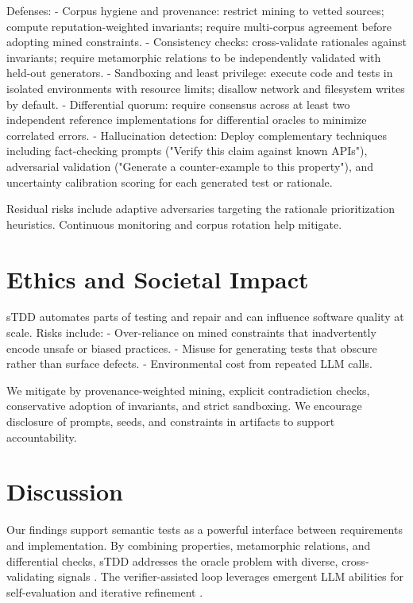 \documentclass[10pt,twocolumn]{article}
\begin{document}
Defenses:
- Corpus hygiene and provenance: restrict mining to vetted sources; compute reputation-weighted invariants; require multi-corpus agreement before adopting mined constraints.
- Consistency checks: cross-validate rationales against invariants; require metamorphic relations to be independently validated with held-out generators.
- Sandboxing and least privilege: execute code and tests in isolated environments with resource limits; disallow network and filesystem writes by default.
- Differential quorum: require consensus across at least two independent reference implementations for differential oracles to minimize correlated errors.
- Hallucination detection: Deploy complementary techniques including fact-checking prompts ("Verify this claim against known APIs"), adversarial validation ("Generate a counter-example to this property"), and uncertainty calibration scoring for each generated test or rationale.

Residual risks include adaptive adversaries targeting the rationale prioritization heuristics. Continuous monitoring and corpus rotation help mitigate.

\section{Ethics and Societal Impact}
sTDD automates parts of testing and repair and can influence software quality at scale. Risks include:
- Over-reliance on mined constraints that inadvertently encode unsafe or biased practices.
- Misuse for generating tests that obscure rather than surface defects.
- Environmental cost from repeated LLM calls.

We mitigate by provenance-weighted mining, explicit contradiction checks, conservative adoption of invariants, and strict sandboxing. We encourage disclosure of prompts, seeds, and constraints in artifacts to support accountability.

\section{Discussion}
Our findings support semantic tests as a powerful interface between requirements and implementation. By combining properties, metamorphic relations, and differential checks, sTDD addresses the oracle problem with diverse, cross-validating signals \cite{Barr2015OracleSurvey,Segura2016MetamorphicSurvey,Shen2019DifferentialSurvey}. The verifier-assisted loop leverages emergent LLM abilities for self-evaluation and iterative refinement \cite{Shinn2023Reflexion,Madaan2023SelfRefine,Wang2023SelfConsistency,Wei2022CoT}.
\end{document}
